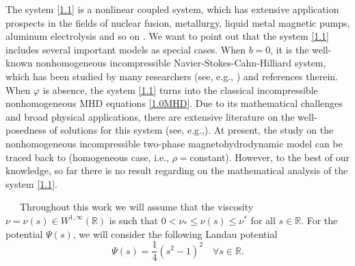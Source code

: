 \documentclass[11pt]{article}
\numberwithin{equation}{section}
\begin{document}
The system \eqref{1.1} is a nonlinear coupled system, which has extensive application prospects in the fields of nuclear fusion,
metallurgy, liquid metal magnetic pumps, aluminum electrolysis and so on \cite{HR,JCT,MSBKT}. We want to point out that the system \eqref{1.1} includes several important models as special cases. When $b=0$, it is the well-known nonhomogeneous incompressible Navier-Stokes-Cahn-Hilliard
 system, which has been studied by many researchers  (see, e.g., \cite{A, ADG, AMH, AAR,SGM}) and references therein.
When $\varphi$ is  absence,  the system \eqref{1.1} turns into the classical incompressible nonhomogeneous MHD equations \eqref{1.0MHD}. Due to its mathematical challenges and broad physical applications, there are extensive literature on the well-posedness of solutions for this system (see, e.g.,\cite{CCM3,CCM4,CW,wu3,wu4,xu2,XQF,XQF1}).
At present, the study on the   nonhomogeneous incompressible two-phase magnetohydrodynamic model  can be traced back to \cite{SZ,YMHYH,wu4}(homogeneous case, i.e., $\rho=$constant). However, to the best of our knowledge,  so far there is no
result regarding on the mathematical analysis of the  system \eqref{1.1}.

\ \ \ Throughout this work we will assume that the viscosity \(\nu = \nu(s) \in W^{1,\infty}(\mathbb{R})\) is such that \(0 < \nu_* \leq \nu(s) \leq \nu^*\) for all \(s \in \mathbb{R}\). For the potential \(\Psi(s)\), we will consider the following  Landau potential
\begin{equation}\label{wei1.4}
\Psi(s) = \frac{1}{4} (s^2 - 1)^2 \quad \forall s \in \mathbb{R}.
\end{equation}
\end{document}
